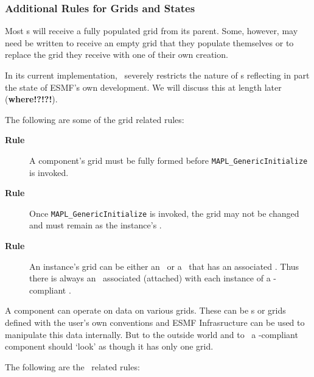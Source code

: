 \subsubsection{Additional Rules for Grids and States}
\label{sec:addRules}
Most \ggc s will receive a fully populated grid from
its parent. Some, however, may need be written to receive an empty
grid that they populate themselves or to replace the grid they receive
with one of their own creation.

In its current implementation, \ggn\ severely restricts the nature
of \grd s reflecting in part the state of ESMF's own development.
We will discuss this at length later (\textbf{where!?!?!}).

The following are some of the grid related rules:
%
\begin{description}
\item[{\bf Rule \thegenct}] A component's grid must be fully formed 
  before {\tt MAPL\_GenericInitialize} is invoked.
  \addtocounter{genct}{1}

\item[{\bf Rule \thegenct}] Once {\tt MAPL\_GenericInitialize} is invoked, 
  the grid may not be changed and must remain as the instance's \grd.
  \addtocounter{genct}{1}

\item[{\bf Rule \thegenct}] An instance's grid can be either an \grd\ or a
  \loc\ that has an associated \grd. Thus there is always an \grd\
  associated (attached) with each instance of a \ggn-compliant \egc.
  \addtocounter{genct}{1}
\end{description}

A component can operate on
data on various grids. These can be \grd s or grids defined with the
user's own conventions and ESMF Infrasructure can be used to
manipulate this data internally. But to the outside world and to \ggn\ 
a \ggn-compliant component should `look' as though it has only one grid.

The following are the \stt\ related rules:

